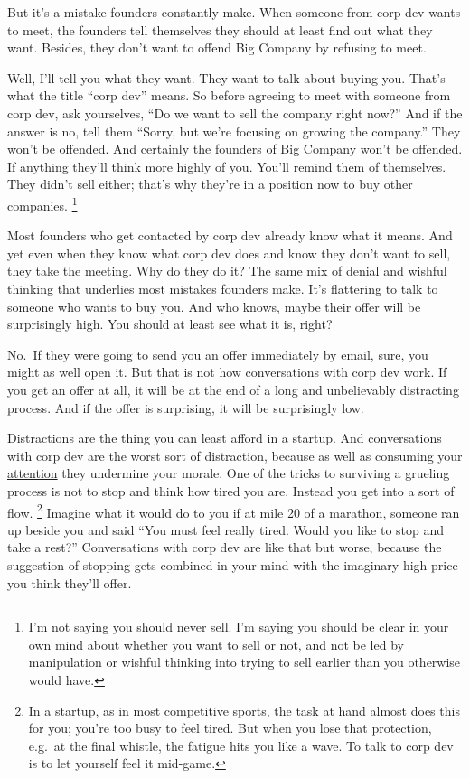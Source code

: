 \documentclass[12pt]{book}
\begin{document}
But it's a mistake founders constantly make. When someone from corp dev
wants to meet, the founders tell themselves they should at least find
out what they want. Besides, they don't want to offend Big Company by
refusing to meet.

Well, I'll tell you what they want. They want to talk about buying you.
That's what the title ``corp dev'' means. So before agreeing to meet
with someone from corp dev, ask yourselves, ``Do we want to sell the
company right now?'' And if the answer is no, tell them ``Sorry, but
we're focusing on growing the company.'' They won't be offended. And
certainly the founders of Big Company won't be offended. If anything
they'll think more highly of you. You'll remind them of themselves. They
didn't sell either; that's why they're in a position now to buy other
companies. \footnote{I'm not saying you should never sell. I'm saying you should be
clear in your own mind about whether you want to sell or not, and not be
led by manipulation or wishful thinking into trying to sell earlier than
you otherwise would have.}

Most founders who get contacted by corp dev already know what it means.
And yet even when they know what corp dev does and know they don't want
to sell, they take the meeting. Why do they do it? The same mix of
denial and wishful thinking that underlies most mistakes founders make.
It's flattering to talk to someone who wants to buy you. And who knows,
maybe their offer will be surprisingly high. You should at least see
what it is, right?

No.~If they were going to send you an offer immediately by email, sure,
you might as well open it. But that is not how conversations with corp
dev work. If you get an offer at all, it will be at the end of a long
and unbelievably distracting process. And if the offer is surprising, it
will be surprisingly low.

Distractions are the thing you can least afford in a startup. And
conversations with corp dev are the worst sort of distraction, because
as well as consuming your \href{top.html}{attention} they undermine your
morale. One of the tricks to surviving a grueling process is not to stop
and think how tired you are. Instead you get into a sort of flow.
\footnote{In a startup, as in most competitive sports, the task at hand
almost does this for you; you're too busy to feel tired. But when you
lose that protection, e.g.~at the final whistle, the fatigue hits you
like a wave. To talk to corp dev is to let yourself feel it mid-game.} Imagine what it would do to you if at mile 20 of
a marathon, someone ran up beside you and said ``You must feel really
tired. Would you like to stop and take a rest?'' Conversations with corp
dev are like that but worse, because the suggestion of stopping gets
combined in your mind with the imaginary high price you think they'll
offer.
\end{document}
